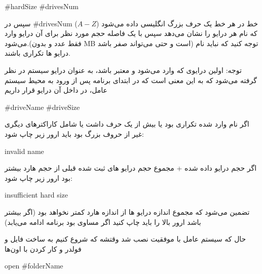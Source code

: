 \documentclass[]{article}
\begin{document}
\begin{tcolorbox}[boxrule=0pt]
	\begin{latin}
  	  \large{
  	  	\#hardSize \#drivesNum
		}
	\end{latin}
\end{tcolorbox}


سپس در \#drivesNum خط در هر خط یک حرف بزرگ انگلیسی داده می‌شود ($A-Z$) که نام هر درایو را نشان می‌دهد سپس با یک فاصله حجم مورد نظر برای آن درایو وارد می‌شود.(فقط عدد و بدون MB است و حتی می‌تواند صفر باشد) توجه کنید که نباید نام درایو ها تکراری باشند.

توجه: اولین درایوی که وارد می‌شود و معتبر باشد، به عنوان درایو سیستم در نظر گرفته می‌شود که به این معنی است که در ابتدای برنامه پس از ورود به محیط سیستم عامل، در داخل آن درایو قرار داریم

\begin{tcolorbox}[boxrule=0pt]
	\begin{latin}
  	  \large{
  	  	\#driveName \#driveSize
		}
	\end{latin}
\end{tcolorbox}


اگر نام وارد شده تکراری بود یا بیش از یک حرف داشت یا شامل کاراکترهای دیگری غیر از حروف بزرگ بود باید ارور زیر چاپ شود:

\begin{tcolorbox}[boxrule=0pt]
	\begin{latin}
  	  \large{
  	  	invalid name
		}
	\end{latin}
\end{tcolorbox}

اگر حجم درایو داده شده + مجموع  حجم درایو های ثبت شده قبلی از حجم هارد بیشتر بود ارور زیر چاپ شود:



\begin{tcolorbox}[boxrule=0pt]
	\begin{latin}
  	  \large{
  	  	insufficient hard size
		}
	\end{latin}
\end{tcolorbox}
تضمین می‌شود که مجموع اندازه درایو ها از اندازه هارد کمتر نخواهد بود (اگر بیشتر باشد ارور بالا را باید چاپ کنید اگر مساوی بود برنامه ادامه می‌یابد)

حال که سیستم عامل با موفقیت نصب شد وقتشه که شروع کنیم به ساخت فایل و فولدر و کار کردن با اون‌ها

\begin{tcolorbox}[boxrule=0pt]
	\begin{latin}
  	  \large{
  	  	open \#folderName
		}
	\end{latin}
\end{tcolorbox}
\end{document}
